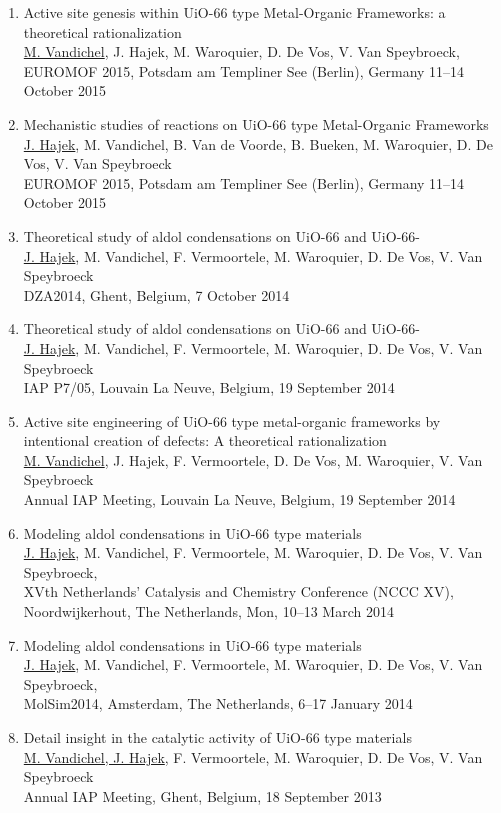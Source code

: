 \begin{enumerate}
\item
Active site genesis within UiO-66 type Metal-Organic Frameworks: a theoretical rationalization\\
\underline{M. Vandichel}, J. Hajek, M. Waroquier, D. De Vos, V. Van
Speybroeck,\\
EUROMOF 2015, Potsdam am Templiner See (Berlin), Germany 11--14 October 2015

\item
Mechanistic studies of reactions on UiO-66 type Metal-Organic Frameworks\\
\underline{J. Hajek}, M. Vandichel, B. Van de Voorde, B. Bueken, M. Waroquier,
D. De Vos, V. Van Speybroeck\\
EUROMOF 2015, Potsdam am Templiner See (Berlin), Germany 11--14 October 2015

\item
Theoretical study of aldol condensations on UiO-66 and UiO-66-\\
\underline{J. Hajek}, M. Vandichel, F. Vermoortele, M. Waroquier, D. De Vos, V.
Van Speybroeck\\
DZA2014, Ghent, Belgium, 7 October 2014

\item
Theoretical study of aldol condensations on UiO-66 and UiO-66-\\
\underline{J. Hajek}, M. Vandichel, F. Vermoortele, M. Waroquier, D. De Vos, V.
Van Speybroeck\\
IAP P7/05, Louvain La Neuve, Belgium, 19 September 2014

\item
Active site engineering of UiO-66 type metal-organic frameworks by intentional creation of defects: A theoretical rationalization\\
\underline{M. Vandichel}, J. Hajek, F. Vermoortele, D. De Vos, M. Waroquier, V.
Van Speybroeck\\
Annual IAP Meeting, Louvain La Neuve, Belgium, 19 September 2014

\item
Modeling aldol condensations in UiO-66 type materials\\
\underline{J. Hajek}, M. Vandichel, F. Vermoortele, M. Waroquier, D. De Vos, V.
Van Speybroeck,\\
XVth Netherlands' Catalysis and Chemistry Conference (NCCC XV), Noordwijkerhout, The Netherlands, Mon, 10--13 March 2014

\item
Modeling aldol condensations in UiO-66 type materials\\
\underline{J. Hajek}, M. Vandichel, F. Vermoortele, M. Waroquier, D. De Vos, V.
Van Speybroeck,\\
MolSim2014, Amsterdam, The Netherlands, 6--17 January 2014

\item
Detail insight in the catalytic activity of UiO-66 type materials\\
\underline{M. Vandichel, J. Hajek}, F. Vermoortele, M. Waroquier, D. De Vos, V.
Van Speybroeck\\
Annual IAP Meeting, Ghent, Belgium, 18 September 2013

\end{enumerate}

\clearpage{\pagestyle{empty}\cleardoublepage}
